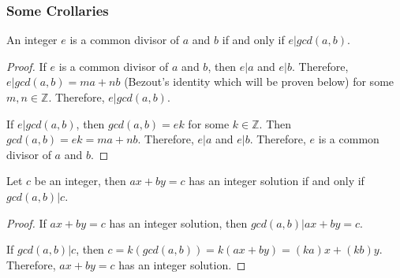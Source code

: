 \documentclass[letterpaper,12pt,oneside]{article}
\begin{document}
\subsubsection{Some Crollaries}
\begin{enumerate}
    \item An integer $e$ is a common divisor of $a$ and $b$ if and only if $e | gcd(a,
              b)$.\begin{proof}

              If $e$ is a common divisor of $a$ and $b$, then $e | a$ and $e | b$. Therefore,
              $e | gcd(a, b) = ma + nb$ (Bezout's identity which will be proven below) for
              some $m, n \in \mathbb{Z}$. Therefore, $e | gcd(a, b)$.

              If $e | gcd(a, b)$, then $gcd(a, b) = ek$ for some $k \in \mathbb{Z}$. Then
              $gcd(a, b) = ek = ma + nb$. Therefore, $e | a$ and $e | b$. Therefore, $e$ is a
              common divisor of $a$ and $b$.
          \end{proof}
    \item Let $c$ be an integer, then $ax+by = c$ has an integer solution if and only if
          $gcd(a, b) | c$.\begin{proof}
              \item
              If $ax + by = c$ has an integer solution, then $gcd(a, b) | ax + by = c$.

              If $gcd(a, b) | c$, then $c = k(gcd(a, b)) = k(ax + by) = (ka)x + (kb)y$.
              Therefore, $ax + by = c$ has an integer solution.
          \end{proof}
\end{enumerate}
\end{document}
